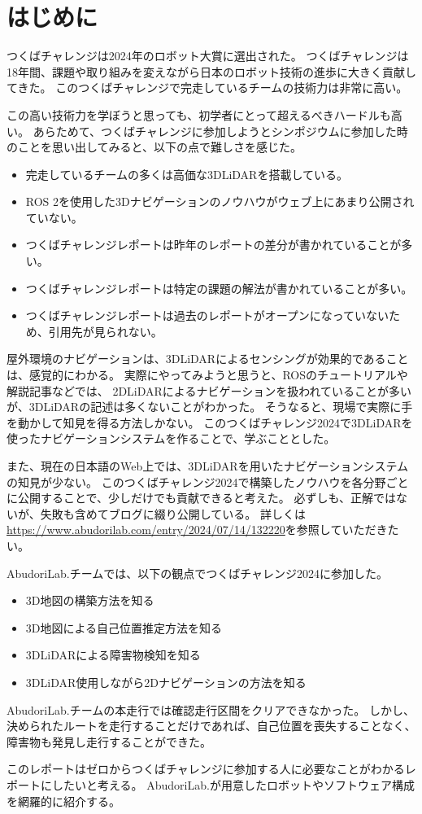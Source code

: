 \section{はじめに}
つくばチャレンジは2024年のロボット大賞に選出\cite{tsukuba}された。
つくばチャレンジは18年間、課題や取り組みを変えながら日本のロボット技術の進歩に大きく貢献してきた。
このつくばチャレンジで完走しているチームの技術力は非常に高い。

この高い技術力を学ぼうと思っても、初学者にとって超えるべきハードルも高い。
あらためて、つくばチャレンジに参加しようとシンポジウムに参加した時のことを思い出してみると、以下の点で難しさを感じた。

\begin{itemize}
    \item 完走しているチームの多くは高価な3DLiDARを搭載している。
    \item ROS 2を使用した3Dナビゲーションのノウハウがウェブ上にあまり公開されていない。
    \item つくばチャレンジレポートは昨年のレポートの差分が書かれていることが多い。
    \item つくばチャレンジレポートは特定の課題の解法が書かれていることが多い。
    \item つくばチャレンジレポートは過去のレポートがオープンになっていないため、引用先が見られない。
\end{itemize}

屋外環境のナビゲーションは、3DLiDARによるセンシングが効果的であることは、感覚的にわかる。
実際にやってみようと思うと、ROSのチュートリアルや解説記事などでは、
2DLiDARによるナビゲーションを扱われていることが多いが、3DLiDARの記述は多くないことがわかった。
そうなると、現場で実際に手を動かして知見を得る方法しかない。
このつくばチャレンジ2024で3DLiDARを使ったナビゲーションシステムを作ることで、学ぶこととした。

また、現在の日本語のWeb上では、3DLiDARを用いたナビゲーションシステムの知見が少ない。
このつくばチャレンジ2024で構築したノウハウを各分野ごとに公開することで、少しだけでも貢献できると考えた。
必ずしも、正解ではないが、失敗も含めてブログに綴り公開している。
詳しくは\url{https://www.abudorilab.com/entry/2024/07/14/132220}を参照していただきたい。


AbudoriLab.チームでは、以下の観点でつくばチャレンジ2024に参加した。
\begin{itemize}
    \item 3D地図の構築方法を知る
    \item 3D地図による自己位置推定方法を知る
    \item 3DLiDARによる障害物検知を知る
    \item 3DLiDAR使用しながら2Dナビゲーションの方法を知る
\end{itemize}

AbudoriLab.チームの本走行では確認走行区間をクリアできなかった。
しかし、決められたルートを走行することだけであれば、自己位置を喪失することなく、障害物も発見し走行することができた。

このレポートはゼロからつくばチャレンジに参加する人に必要なことがわかるレポートにしたいと考える。
AbudoriLab.が用意したロボットやソフトウェア構成を網羅的に紹介する。